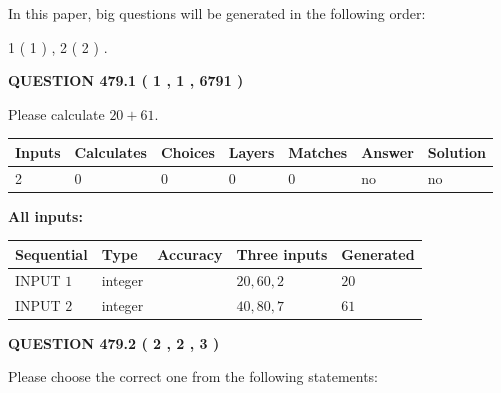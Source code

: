 \documentclass[12pt]{article}
\begin{document}
\vspace{0.2in}
   
In this paper, big questions will be generated in the following order: 
   
   
   1 ( 1 )
 ,
   2 ( 2 )
 .
  
\vspace{0.2in}
  
{\textbf{\Large{QUESTION
479.1 
 ( 1 , 1 , 6791 )
}}}
  
  
 
Please calculate $ %
20 +  %
61 $.
 
 
   
   
   
   
\noindent\begin{tabular}{|l|l|l|l|l|l|l|}
 \hline
Inputs & Calculates & Choices & Layers & Matches & Answer & Solution \\ \hline
 2  & 
 0  & 
 0
  & 
 0  & 
 0  & 
  no & 
  no 
  \\ \hline
 \end{tabular}
   
   
   
   
\noindent{}
   
   
   
   
\noindent\vspace{0.1in}\hspace{-0.08in} {\textbf{\Large{All inputs: }}}
   
   
  
  
\noindent\begin{tabular}{|l|l|l|l|l|}
\hline
 Sequential & Type & Accuracy & Three inputs & Generated \\ 
\hline
 
 
  INPUT $  1 $ & integer &  & $
 20
 , 
 60
 , 
 2
 $ & $ 20 $ 
 \\  \hline  
 
 
  INPUT $  2 $ & integer &  & $
 40
 , 
 80
 , 
 7
 $ & $ 61 $ 
 \\  \hline  
 \end{tabular}
   
   
  
\vspace{0.2in}
  
{\textbf{\Large{QUESTION
479.2 
 ( 2 , 2 , 3 )
}}}
  
  
Please choose the correct one from the following statements:
 
\end{document}
